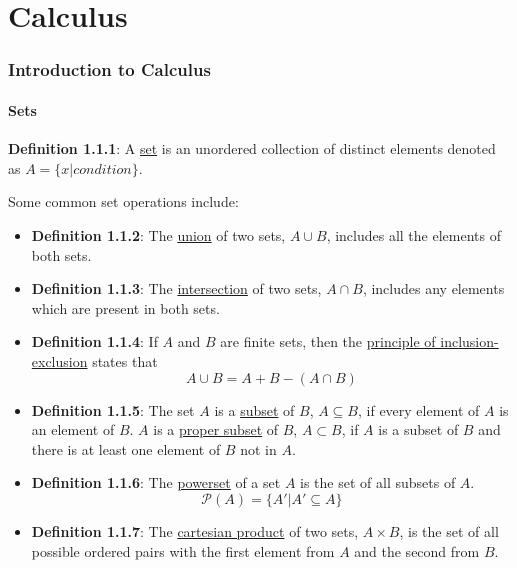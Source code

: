 \documentclass{article}
\title{\thetitle\\[0.5em]\large{\thesubtitle}}
\author{\theauthor}
\date{\thedate}
\newcommand{\separate}[1] {\vspace{#1 pt}\noindent}
\newcommand{\definition}[2]{\textbf{Definition #1}: #2\label{def:#1}}
\begin{document}
\maketitle\thispagestyle{empty} %
\newpage\tableofcontents %

\clearpage\setcounter{page}{1}\newpage %
\pagestyle{fancy}





\part{Calculus}\label{part:1.calc}

\section{Introduction to Calculus}

\subsection{Sets}

\definition{1.1.1}{A \underline{set} is an unordered collection of distinct elements denoted as \(A = \{x | \textit{condition} \}\).}

\separate{7}Some common set operations include:
\begin{itemize}
    \item \definition{1.1.2}{The \underline{union} of two sets, \(A \cup B\), includes all the elements of both sets.}
    \item \definition{1.1.3}{The \underline{intersection} of two sets, \(A \cap B\), includes any elements which are present in both sets.}
    \item \definition{1.1.4}{If \(A\) and \(B\) are finite sets, then the \underline{principle of inclusion-exclusion} states that 
    \begin{equation}
        A \cup B = A + B - (A \cap B)
    \end{equation}}
    \item \definition{1.1.5}{The set \(A\) is a \underline{subset} of \(B\), \(A \subseteq B\), if every element of \(A\) is an element of \(B\). \(A\) is a \underline{proper subset} of \(B\), \(A \subset B\), if \(A\) is a subset of \(B\) and there is at least one element of \(B\) not in \(A\).}
    \item \definition{1.1.6}{The \underline{powerset} of a set \(A\) is the set of all subsets of \(A\). 
    \begin{equation}
        \mathcal{P}(A) = \{A'|A' \subseteq A\}
    \end{equation}}
    \item \definition{1.1.7}{The \underline{cartesian product} of two sets, \(A \times B\), is the set of all possible ordered pairs with the first element from \(A\) and the second from \(B\).}
\end{itemize}
\end{document}

